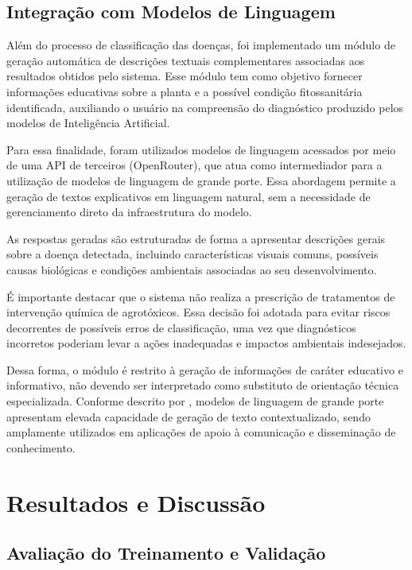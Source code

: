 \documentclass[portuguese]{sbc2025}%
\begin{document}
\subsection{Integração com Modelos de Linguagem}

Além do processo de classificação das doenças, foi implementado um módulo de geração automática de descrições textuais complementares
associadas aos resultados obtidos pelo sistema. Esse módulo tem como objetivo fornecer informações educativas sobre a planta e a 
possível condição fitossanitária identificada, auxiliando o usuário na compreensão do diagnóstico produzido pelos modelos de 
Inteligência Artificial.

Para essa finalidade, foram utilizados modelos de linguagem acessados por meio de uma API de terceiros (OpenRouter), que atua como 
intermediador para a utilização de modelos de linguagem de grande porte. Essa abordagem permite a geração de textos explicativos em 
linguagem natural, sem a necessidade de gerenciamento direto da infraestrutura do modelo.

As respostas geradas são estruturadas de forma a apresentar descrições gerais sobre a doença detectada, incluindo características 
visuais comuns, possíveis causas biológicas e condições ambientais associadas ao seu desenvolvimento.

É importante destacar que o sistema não realiza a prescrição de tratamentos de intervenção química de agrotóxicos.
Essa decisão foi adotada para evitar riscos decorrentes de possíveis erros de classificação, uma vez que diagnósticos incorretos 
poderiam levar a ações inadequadas e impactos ambientais indesejados.

Dessa forma, o módulo é restrito à geração de informações de caráter educativo e informativo, não devendo ser interpretado como 
substituto de orientação técnica especializada. Conforme descrito por \citep{ref22}, modelos de linguagem de grande porte apresentam 
elevada capacidade de geração de texto contextualizado, sendo amplamente utilizados em aplicações de apoio à comunicação e 
disseminação de conhecimento.

\section{Resultados e Discussão}
\label{sec:Resultados e Discussão}

\subsection{Avaliação do Treinamento e Validação}
\end{document}
